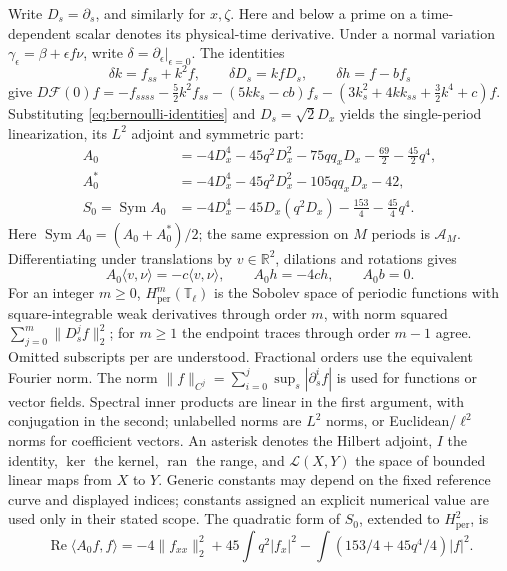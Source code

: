 \documentclass[a4paper,11pt]{article}
\numberwithin{equation}{section}
\theoremstyle{definition}
\theoremstyle{remark}
\newcommand{\R}{\mathbb R}
\newcommand{\T}{\mathbb T}
\newcommand{\per}{\mathrm{per}}
\newcommand{\Sym}{\operatorname{Sym}}
\newcommand{\norm}[1]{\lVert#1\rVert}
\newcommand{\ip}[2]{\langle#1,#2\rangle}
\newcommand{\calF}{\mathcal F}
\renewcommand{\Re}{\operatorname{Re}}
\begin{document}
Write $D_s=\partial_s$, and similarly for $x,\zeta$. Here and below a prime on a time-dependent scalar denotes its physical-time derivative. Under a normal variation $\gamma_\epsilon=\beta+\epsilon f\nu$, write $\delta=\partial_\epsilon|_{\epsilon=0}$. The identities
\[
 \delta k=f_{ss}+k^2f,\qquad \delta D_s=kfD_s,\qquad \delta h=f-bf_s
\]
give $D\calF(0)f=-f_{ssss}-\tfrac52k^2f_{ss}-(5kk_s-cb)f_s-(3k_s^2+4kk_{ss}+\tfrac32k^4+c)f$. Substituting \eqref{eq:bernoulli-identities} and $D_s=\sqrt2D_x$ yields the single-period linearization, its $L^2$ adjoint and symmetric part:
\begin{align}
 A_0&=-4D_x^4-45q^2D_x^2-75qq_xD_x-\tfrac{69}{2}-\tfrac{45}{2}q^4,
 \label{eq:A0}\\
 A_0^*&=-4D_x^4-45q^2D_x^2-105qq_xD_x-42,\label{eq:Astar}\\
 S_0=\Sym A_0&=-4D_x^4-45D_x(q^2D_x)-\tfrac{153}{4}-\tfrac{45}{4}q^4.
 \label{eq:S0}
\end{align}
Here $\Sym A_0=(A_0+A_0^*)/2$; the same expression on $M$ periods is $\mathcal A_M$. Differentiating under translations by $v\in\R^2$, dilations and rotations gives
\begin{equation}\label{eq:modes}
 A_0\ip v\nu=-c\ip v\nu,\qquad A_0h=-4ch,\qquad A_0b=0.
\end{equation}
For an integer $m\ge0$, $H^m_\per(\T_\ell)$ is the Sobolev space of periodic functions with square-integrable weak derivatives through order $m$, with norm squared $\sum_{j=0}^m\norm{D_s^jf}_2^2$; for $m\ge1$ the endpoint traces through order $m-1$ agree. Omitted subscripts $\per$ are understood. Fractional orders use the equivalent Fourier norm. The norm $\norm{f}_{C^j}=\sum_{i=0}^j\sup_s|\partial_s^if|$ is used for functions or vector fields. Spectral inner products are linear in the first argument, with conjugation in the second; unlabelled norms are $L^2$ norms, or Euclidean/$\ell^2$ norms for coefficient vectors. An asterisk denotes the Hilbert adjoint, $I$ the identity, $\ker$ the kernel, $\operatorname{ran}$ the range, and $\mathcal L(X,Y)$ the space of bounded linear maps from $X$ to $Y$. Generic constants may depend on the fixed reference curve and displayed indices; constants assigned an explicit numerical value are used only in their stated scope.
The quadratic form of $S_0$, extended to $H^2_\per$, is
\begin{equation}\label{eq:energy}
 \Re\ip{A_0f}f=-4\norm{f_{xx}}_2^2+45\int q^2|f_x|^2
       -\int(153/4+45q^4/4)|f|^2.
\end{equation}
\end{document}
